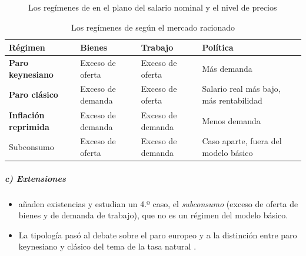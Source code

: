 \documentclass[11pt]{article}
\begin{document}
\begin{figure}[H]
\centering
\caption{Los regímenes de  en el plano del salario nominal y el nivel de precios}\label{fig:malinvaud}
\end{figure}

\begin{table}[H]
\centering
\caption{Los regímenes de  según el mercado racionado}\label{tab:malinvaud}
\small
\begin{tabular}{>{\raggedright\arraybackslash}m{3.2cm}>{\centering\arraybackslash}m{3cm}>{\centering\arraybackslash}m{3cm}>{\raggedright\arraybackslash}m{4.2cm}}
\toprule
\rowcolor{tceeazulpalido}\textbf{Régimen} & \textbf{Bienes} & \textbf{Trabajo} & \textbf{Política}\\
\midrule
\textcolor{tceeazul}{\textbf{Paro keynesiano}} & Exceso de oferta & Exceso de oferta & Más demanda\\
\addlinespace[0.3em]
\textcolor{tceeverde}{\textbf{Paro clásico}} & Exceso de demanda & Exceso de oferta & Salario real más bajo, más rentabilidad\\
\addlinespace[0.3em]
\textcolor{tceerojo}{\textbf{Inflación reprimida}} & Exceso de demanda & Exceso de demanda & Menos demanda\\
\addlinespace[0.3em]
\textcolor{tceedorado}{Subconsumo} & Exceso de oferta & Exceso de demanda & Caso aparte, fuera del modelo básico\\
\bottomrule
\end{tabular}
\end{table}

\subparagraph{c) Extensiones}

\begin{itemize}
\item \textcite{MuellbauerPortes1978Macroeconomic} añaden existencias y estudian un 4.º caso, el \emph{subconsumo} (exceso de oferta de bienes y de demanda de trabajo), que no es un régimen del modelo básico.
\item La tipología pasó al debate sobre el paro europeo y a la distinción entre paro keynesiano y clásico del tema de la tasa natural .
\end{itemize}
\end{document}

